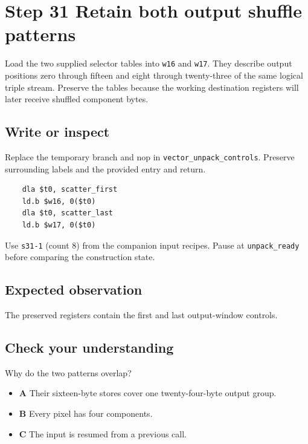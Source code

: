 \section{Step 31 Retain both output shuffle patterns}\label{rgb-s31}

Load the two supplied selector tables into \texttt{w16} and \texttt{w17}. They describe output positions zero through fifteen and eight through twenty-three of the same logical triple stream. Preserve the tables because the working destination registers will later receive shuffled component bytes.

\subsection{Write or inspect}
Replace the temporary branch and nop in \texttt{vector\_unpack\_controls}. Preserve surrounding labels and the provided entry and return.

\begin{verbatim}
    dla $t0, scatter_first
    ld.b $w16, 0($t0)
    dla $t0, scatter_last
    ld.b $w17, 0($t0)
\end{verbatim}
Use \texttt{s31-1} (count 8) from the companion input recipes. Pause at \texttt{unpack\_ready} before comparing the construction state.

\subsection{Expected observation}
The preserved registers contain the first and last output-window controls.

\subsection{Check your understanding}
Why do the two patterns overlap?

\begin{itemize}
  \item \textbf{A} Their sixteen-byte stores cover one twenty-four-byte output group.
  \item \textbf{B} Every pixel has four components.
  \item \textbf{C} The input is resumed from a previous call.
\end{itemize}
